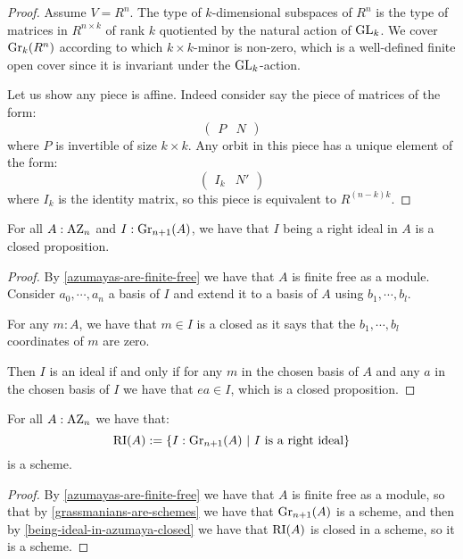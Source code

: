 \begin{proof}
Assume $V=R^n$. The type of $k$-dimensional subspaces of $R^n$ is the type of matrices in $R^{n\times k}$ of rank $k$ quotiented by the natural action of $\operatorname{GL}_k$. We cover $\mathrm{Gr}_k(R^n)$ according to which $k\times k$-minor is non-zero, which is a well-defined finite open cover since it is invariant under the $\operatorname{GL}_k$-action. 

Let us show any piece is affine. Indeed consider say the piece of matrices of the form:
\[\begin{pmatrix}
P & N
\end{pmatrix}\]
where $P$ is invertible of size $k\times k$. Any orbit in this piece has a unique element of the form:
\[\begin{pmatrix}
I_k & N'
\end{pmatrix}\]
where $I_k$ is the identity matrix, so this piece is equivalent to $R^{(n-k)k}$.
\end{proof}

\begin{lemma}\label{being-ideal-in-azumaya-closed}
For all $A:\mathrm{AZ}_n$ and $I:\mathrm{Gr}_{n+1}(A)$, we have that $I$ being a right ideal in $A$ is a closed proposition.
\end{lemma}

\begin{proof}
By \cref{azumayas-are-finite-free} we have that $A$ is finite free as a module. Consider $a_0,\cdots,a_n$ a basis of $I$ and extend it to a basis of $A$ using $b_1,\cdots,b_l$. 

For any $m:A$, we have that $m\in I$ is a closed as it says that the $b_1,\cdots,b_l$ coordinates of $m$ are zero. 

Then $I$ is an ideal if and only if for any $m$ in the chosen basis of $A$ and any $a$ in the chosen basis of $I$ we have that $ea\in I$, which is a closed proposition.
\end{proof}

\begin{lemma}\label{severi-brauer-are-schemes}
For all $A:\mathrm{AZ}_n$ we have that:
\[\RI(A) := \{I:\Gr_{n+1}(A)\ |\ I\ \mathrm{is\ a\ right\ ideal}\}\]
is a scheme.
\end{lemma}

\begin{proof}
By \cref{azumayas-are-finite-free} we have that $A$ is finite free as a module, so that by \cref{grassmanians-are-schemes} we have that $\mathrm{Gr}_{n+1}(A)$ is a scheme, and then by \cref{being-ideal-in-azumaya-closed} we have that $\mathrm{RI}(A)$ is closed in a scheme, so it is a scheme.
\end{proof}


